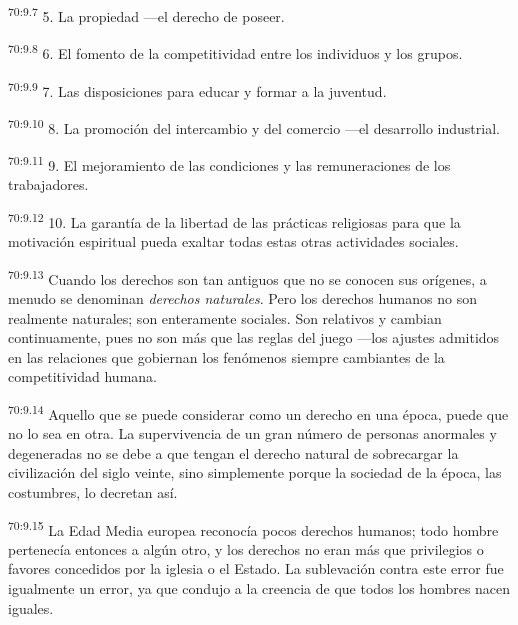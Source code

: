 \par
\textsuperscript{70:9.7} 5. La propiedad ---el derecho de poseer.

\par
\textsuperscript{70:9.8} 6. El fomento de la competitividad entre los individuos y los grupos.

\par
\textsuperscript{70:9.9} 7. Las disposiciones para educar y formar a la juventud.

\par
\textsuperscript{70:9.10} 8. La promoción del intercambio y del comercio ---el desarrollo industrial.

\par
\textsuperscript{70:9.11} 9. El mejoramiento de las condiciones y las remuneraciones de los trabajadores.

\par
\textsuperscript{70:9.12} 10. La garantía de la libertad de las prácticas religiosas para que la motivación espiritual pueda exaltar todas estas otras actividades sociales.

\par
\textsuperscript{70:9.13} Cuando los derechos son tan antiguos que no se conocen sus orígenes, a menudo se denominan \textit{derechos naturales}. Pero los derechos humanos no son realmente naturales; son enteramente sociales. Son relativos y cambian continuamente, pues no son más que las reglas del juego ---los ajustes admitidos en las relaciones que gobiernan los fenómenos siempre cambiantes de la competitividad humana.

\par
\textsuperscript{70:9.14} Aquello que se puede considerar como un derecho en una época, puede que no lo sea en otra. La supervivencia de un gran número de personas anormales y degeneradas no se debe a que tengan el derecho natural de sobrecargar la civilización del siglo veinte, sino simplemente porque la sociedad de la época, las costumbres, lo decretan así.

\par
\textsuperscript{70:9.15} La Edad Media europea reconocía pocos derechos humanos; todo hombre pertenecía entonces a algún otro, y los derechos no eran más que privilegios o favores concedidos por la iglesia o el Estado. La sublevación contra este error fue igualmente un error, ya que condujo a la creencia de que todos los hombres nacen iguales.

